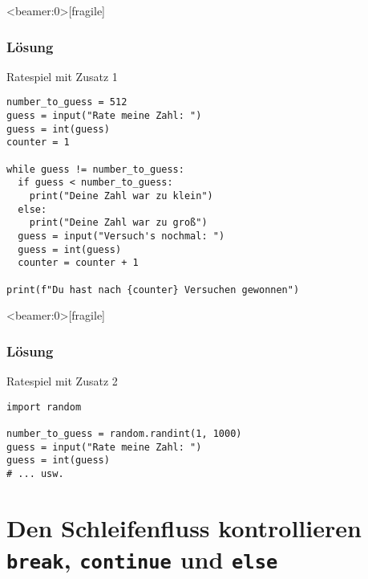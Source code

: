 \begin{frame}<beamer:0>[fragile]
\frametitle{Lösung}
\begin{solutionblock}{Ratespiel mit Zusatz 1}
\begin{verbatim}
number_to_guess = 512
guess = input("Rate meine Zahl: ")
guess = int(guess)
counter = 1

while guess != number_to_guess:
  if guess < number_to_guess:
    print("Deine Zahl war zu klein")
  else:
    print("Deine Zahl war zu groß")
  guess = input("Versuch's nochmal: ")
  guess = int(guess)
  counter = counter + 1
  
print(f"Du hast nach {counter} Versuchen gewonnen")	
\end{verbatim}
\end{solutionblock}
\end{frame}






\begin{frame}<beamer:0>[fragile]
\frametitle{Lösung}
\begin{solutionblock}{Ratespiel mit Zusatz 2}
\begin{verbatim}
import random 

number_to_guess = random.randint(1, 1000)
guess = input("Rate meine Zahl: ")
guess = int(guess)
# ... usw. 
\end{verbatim}
\end{solutionblock}
\end{frame}

\section{Den Schleifenfluss kontrollieren  \\ \footnotesize \texttt{break}, \texttt{continue} und \texttt{else}}


